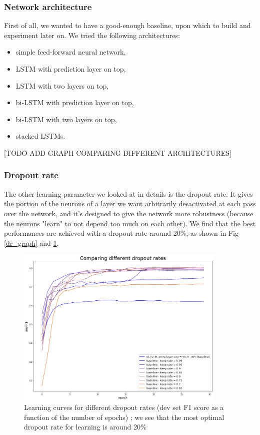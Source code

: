 \documentclass{article} %
\begin{document}
\subsubsection{Network architecture}

First of all, we wanted to have a good-enough baseline, upon which to build and experiment later on. We tried the following architectures:
\begin{itemize}
\item simple feed-forward neural network,
\item LSTM with prediction layer on top,
\item LSTM with two layers on top,
\item bi-LSTM with prediction layer on top,
\item bi-LSTM with two layers on top,
\item stacked LSTMs.
\end{itemize}

[TODO ADD GRAPH COMPARING DIFFERENT ARCHITECTURES]

\subsubsection{Dropout rate}

The other learning parameter we looked at in details is the dropout rate. It gives the portion of the neurons of a layer we want arbitrarily desactivated at each pass over the network, and it's designed to give the network more robustness (because the neurons "learn" to not depend too much on each other). We find that the best performances are achieved with a dropout rate around 20\%, as shown in Fig \ref{dr_graph} and \ref{dr_devf1}.

\begin{figure}[h]
\begin{center}
\includegraphics[width=380px]{figs/dr_devf1.png}
\caption{Learning curves for different dropout rates (dev set F1 score as a function of the number of epochs) ; we see that the most optimal dropout rate for learning is around 20\%}
\label{dr_devf1}
\end{center}
\end{figure}
\end{document}
